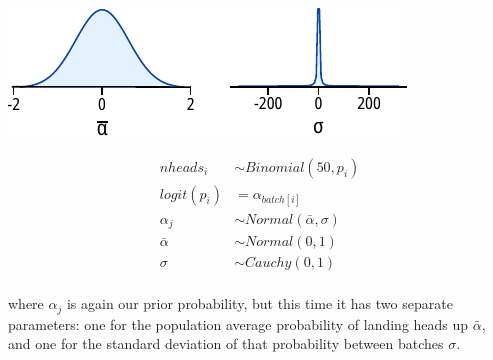\begin{minipage}{.5\textwidth}
\centering
\includegraphics[width=\textwidth]{coinflip_priors_2.pdf}
\end{minipage}
\begin{minipage}{.5\textwidth}
\centering
\begin{equation} \label{eq:coinflip_priors_2}
\begin{split}
nheads_i &\sim Binomial(50, p_i) \\
logit(p_i) &= \alpha_{batch[i]} \\
\alpha_j &\sim Normal(\bar{\alpha}, \sigma) \\
\bar{\alpha} &\sim Normal(0, 1) \\
\sigma &\sim Cauchy(0, 1) \\
\end{split}
\end{equation}
\end{minipage}

where $\alpha_j$ is again our prior probability, but this time it has two separate parameters: one for the population average probability of landing heads up $\bar{\alpha}$, and one for the standard deviation of that probability between batches $\sigma$.

